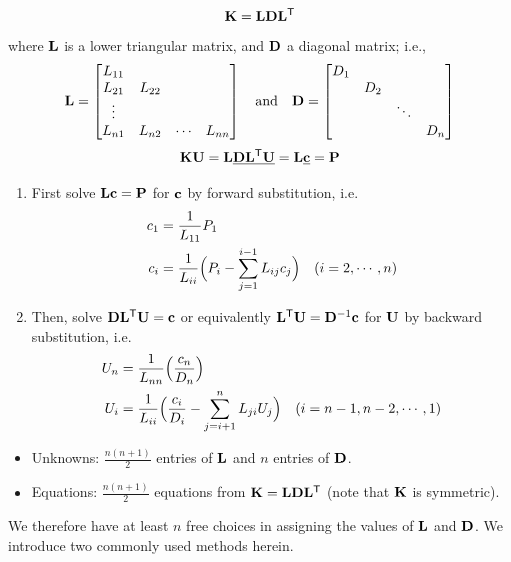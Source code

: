 \begin{equation}
  \mathbf{K} = \mathbf{L}\mathbf{D}\mathbf{L}^{\mathsf{T}}
\end{equation}
where $\mathbf{L}$ is a lower triangular matrix, and $\mathbf{D}$ a diagonal matrix; i.e.,
\begin{equation}
  \mathbf{L} = \begin{bmatrix}L_{11} & & & \\ L_{21} & L_{22} & & \\ \vdots & & & \\ L_{n1} & L_{n2} & \cdots & L_{nn}\end{bmatrix}
  \quad\text{and}\quad
  \mathbf{D} = \begin{bmatrix}D_1 & & & \\ & D_2 & & \\ & & \ddots & \\ & & & D_n\end{bmatrix}
\end{equation}
\begin{equation}
  \mathbf{K}\mathbf{U} = \mathbf{L}\underline{\mathbf{D}\mathbf{L}^{\mathsf{T}}\mathbf{U}} = \mathbf{L}\underline{\mathbf{c}} = \mathbf{P}
\end{equation}

\begin{enumerate}
  \item First solve $\mathbf{L}\mathbf{c} = \mathbf{P}$ for $\mathbf{c}$ by forward substitution, i.e.
    \begin{align}
      c_1 &= \frac{1}{L_{11}}P_1\\
      c_i &= \frac{1}{L_{ii}}\Bigl(P_i - \sum_{j=1}^{i-1}L_{ij}c_j\Bigr)\quad(i = 2,\cdots,n)
    \end{align}
  \item Then, solve $\mathbf{D}\mathbf{L}^{\mathsf{T}}\mathbf{U} = \mathbf{c}$ or equivalently $\mathbf{L}^{\mathsf{T}}\mathbf{U} = \mathbf{D}^{-1}\mathbf{c}$ for $\mathbf{U}$ by backward substitution, i.e.
    \begin{align}
      U_n &= \frac{1}{L_{nn}}\Bigl(\frac{c_n}{D_n}\Bigr)\\
      U_i &= \frac{1}{L_{ii}}\Bigl(\frac{c_i}{D_i} - \sum_{j=i+1}^{n}L_{ji}U_j\Bigr)\quad(i = n-1, n-2,\cdots,1)
    \end{align}
\end{enumerate}

\begin{itemize}
  \item Unknowns: $\frac{n(n+1)}{2}$ entries of $\mathbf{L}$ and $n$ entries of $\mathbf{D}$.
  \item Equations: $\frac{n(n+1)}{2}$ equations from $\mathbf{K} = \mathbf{L}\mathbf{D}\mathbf{L}^{\mathsf{T}}$ (note that $\mathbf{K}$ is symmetric).
\end{itemize}
We therefore have at least $n$ free choices in assigning the values of $\mathbf{L}$ and $\mathbf{D}$. We introduce two commonly used methods herein.

